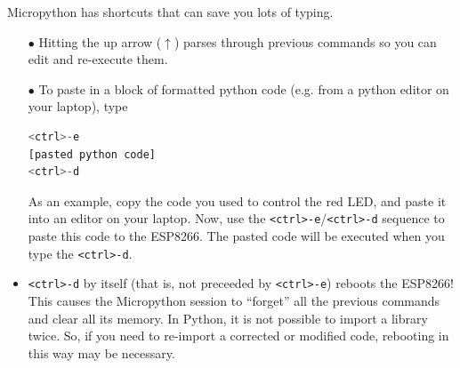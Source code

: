 %



	\begin{kaobox}[frametitle=Some MicroPython shortcuts...] \label{copy_paste}
	Micropython has shortcuts that can save you lots of typing.
	\begin{itemize}
	\item[$\bullet$] Hitting the up arrow ($\uparrow$) parses through previous commands so you can edit and re-execute them.
	\item[$\bullet$] To paste in a block of formatted python code (e.g. from a python editor on your laptop), type
\begin{lstlisting}[language=Python]
<ctrl>-e
[pasted python code]
<ctrl>-d
\end{lstlisting}
	As an example, copy the code you used to control the red LED, and paste it into an editor on your laptop.
	Now, use the \texttt{<ctrl>-e}/\texttt{<ctrl>-d} sequence to paste this code to the ESP8266.
	The pasted code will be executed when you type the \texttt{<ctrl>-d}.

	\item  \texttt{<ctrl>-d} by itself (that is, not preceeded by \texttt{<ctrl>-e}) reboots the ESP8266!
	This causes the Micropython session to “forget” all the previous commands and clear all its memory.
	In Python, it is not possible to import a library twice.
	So, if you need to re-import a corrected or modified code, rebooting in this way may be necessary.
	\end{itemize}
	\end{kaobox}

